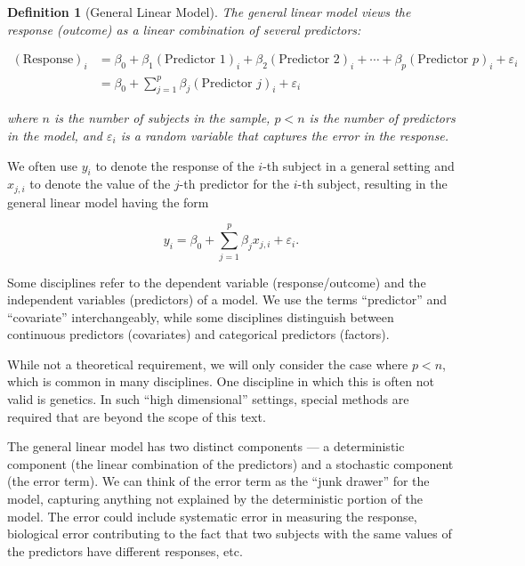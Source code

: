 \documentclass[
]{book}
\theoremstyle{plain}
\theoremstyle{mydefn}
\newtheorem{definition}{Definition}[chapter]
\theoremstyle{myexmpl}
\theoremstyle{remark}
\begin{document}
\begin{definition}[General Linear Model]
The general linear model views the response (outcome) as a linear combination of several predictors:

\[
\begin{aligned}
  (\text{Response})_i 
    &= \beta_0 + \beta_1 (\text{Predictor 1})_{i} + \beta_2 (\text{Predictor 2})_{i} + \dotsb + 
      \beta_p (\text{Predictor } p)_{i} + \varepsilon_i \\
    &= \beta_0 + \sum\limits_{j=1}^{p} \beta_j (\text{Predictor } j)_{i} + \varepsilon_i
\end{aligned}
\]

where \(n\) is the number of subjects in the sample, \(p < n\) is the number of predictors in the model, and \(\varepsilon_i\) is a random variable that captures the error in the response.
\end{definition}

We often use \(y_i\) to denote the response of the \(i\)-th subject in a general setting and \(x_{j,i}\) to denote the value of the \(j\)-th predictor for the \(i\)-th subject, resulting in the general linear model having the form

\[y_i = \beta_0 + \sum\limits_{j=1}^{p} \beta_j x_{j, i} + \varepsilon_i.\]

\begin{rmdtip}
Some disciplines refer to the dependent variable (response/outcome) and the independent variables (predictors) of a model. We use the terms ``predictor'' and ``covariate'' interchangeably, while some disciplines distinguish between continuous predictors (covariates) and categorical predictors (factors).
\end{rmdtip}

\begin{rmdtip}
While not a theoretical requirement, we will only consider the case where \(p < n\), which is common in many disciplines. One discipline in which this is often not valid is genetics. In such ``high dimensional'' settings, special methods are required that are beyond the scope of this text.
\end{rmdtip}

The general linear model has two distinct components --- a deterministic component (the linear combination of the predictors) and a stochastic component (the error term). We can think of the error term as the ``junk drawer'' for the model, capturing anything not explained by the deterministic portion of the model. The error could include systematic error in measuring the response, biological error contributing to the fact that two subjects with the same values of the predictors have different responses, etc.
\end{document}
